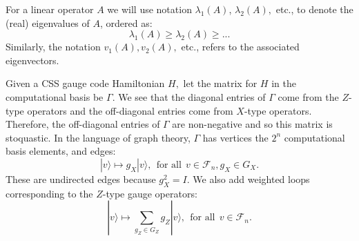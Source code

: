 \documentclass[a4paper,onecolumn,11pt,unpublished]{quantumarticle}
\def\Complex{\mathbb{C}}
\def\Ham{H}
\def\Pauli{\mathcal{P}}
\newcommand{\ket}[1]{|{#1}\rangle}
\def\smbox#1{\ \ \mbox{#1}\ \ }
\newcommand{\Field}{\mathcal{F}}
\def\Fn{\Field^n}
\def\Fnd{\Field_{n}}
\begin{document}
For a linear operator $A$ we will use notation 
$\lambda_1(A)$, $\lambda_2(A),$ etc., to denote the (real) eigenvalues of $A$,
ordered as:
$$
    \lambda_1(A) \ge \lambda_2(A) \ge ...
$$
Similarly, the notation $v_1(A), v_2(A),$ etc., refers to the associated eigenvectors.



Given a CSS gauge code Hamiltonian $H,$ 
let the matrix for $H$ in the computational basis be $\Gamma.$
We see that the diagonal entries of $\Gamma$
come from the $Z$-type operators and the off-diagonal entries 
come from $X$-type operators.
Therefore, the off-diagonal entries of $\Gamma$ are non-negative 
and so this matrix is stoquastic.
In the language of graph theory,
$\Gamma$ has vertices the $2^n$ computational
basis elements, and edges:
$$
    \ket{v} \mapsto g_X \ket{v}, \smbox{for all} v\in\Fnd, g_X\in G_X.
$$
These are undirected edges because $g_X^2 = I.$
We also add weighted loops corresponding to the $Z$-type gauge operators:
$$
    \ket{v} \mapsto \sum_{g_Z\in G_Z} g_Z \ket{v}, \smbox{for all} v\in\Fnd.
$$
\end{document}
